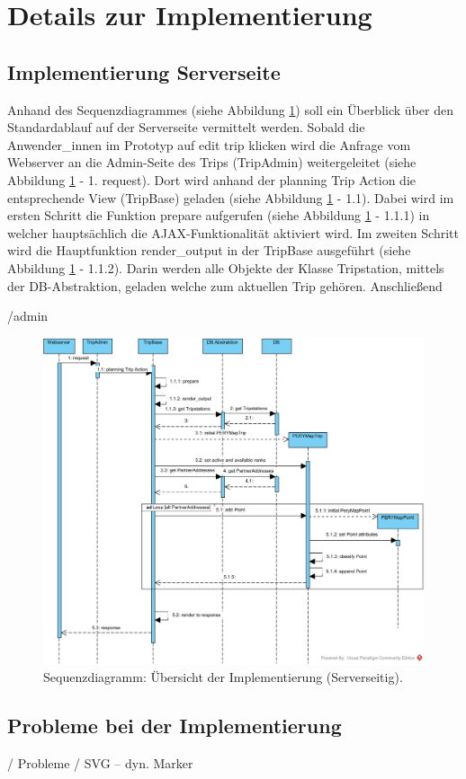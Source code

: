 \documentclass[Bachelorarbeit.tex]{subfiles}
\begin{document}
\section{Details zur Implementierung}
\label{chap:implementierung:sec:details}

\subsection{Implementierung Serverseite}
Anhand des Sequenzdiagrammes (siehe Abbildung \ref{fig:RenderPrototypMap}) soll ein  Überblick über den Standardablauf auf der Serverseite vermittelt werden. 
Sobald die Anwender\_innen im  Prototyp auf edit trip klicken wird die Anfrage vom Webserver an die Admin-Seite des Trips (TripAdmin) weitergeleitet (siehe Abbildung \ref{fig:RenderPrototypMap} - 1. request). 
Dort wird anhand der planning Trip Action die entsprechende View (TripBase) geladen (siehe Abbildung \ref{fig:RenderPrototypMap} - 1.1).
Dabei wird im ersten Schritt die Funktion prepare aufgerufen (siehe Abbildung \ref{fig:RenderPrototypMap} - 1.1.1) in welcher hauptsächlich die \ac{AJAX}-Funktionalität aktiviert wird.
Im zweiten Schritt wird die Hauptfunktion render_output in der TripBase ausgeführt  (siehe Abbildung \ref{fig:RenderPrototypMap} - 1.1.2).
Darin werden alle Objekte der Klasse Tripstation, mittels der \ac{DB}-Abstraktion, geladen welche zum aktuellen Trip gehören. 
Anschließend 

/admin
\begin{figure}[h]
\centering
\includegraphics[width=1\linewidth]{img/Implementierung/RenderPrototypMap}
\caption[k]{Sequenzdiagramm: Übersicht der Implementierung (Serverseitig).}
\label{fig:RenderPrototypMap}
\end{figure}


\subsection{Probleme bei der Implementierung}
/ Probleme
/ SVG -- dyn. Marker
\end{document}
